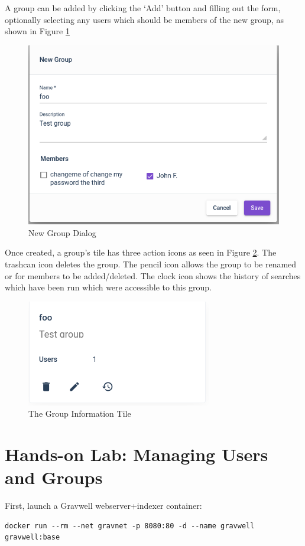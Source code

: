 A group can be added by clicking the `Add' button and filling out the
form, optionally selecting any users which should be members of the new
group, as shown in Figure \ref{fig:newgroup}

\begin{figure}
	\includegraphics[width=0.6\linewidth]{images/newgroup.png}
	\caption{New Group Dialog}
	\label{fig:newgroup}
\end{figure}

Once created, a group's tile has three action icons as seen in Figure \ref{fig:grouptile}.
The trashcan icon deletes the group. The pencil icon allows the group
to be renamed or for members to be added/deleted. The clock icon shows
the history of searches which have been run which were accessible to
this group.

\begin{figure}
	\includegraphics[width=0.5\linewidth]{images/grouptile.png}
	\caption{The Group Information Tile}
	\label{fig:grouptile}
\end{figure}

\clearpage
\section{Hands-on Lab: Managing Users and Groups}

First, launch a Gravwell webserver+indexer container:

\begin{Verbatim}[breaklines=true]
docker run --rm --net gravnet -p 8080:80 -d --name gravwell gravwell:base
\end{Verbatim}

